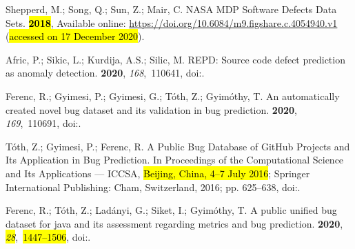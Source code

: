 \documentclass[mathematics,review,accept,moreauthors,pdftex]{Definitions/mdpi}
\begin{document}
\begin{thebibliography}{999}
Shepperd, M.; Song, Q.; Sun, Z.; Mair, C.
\newblock NASA MDP Software Defects Data Sets.  \textbf{\hl{2018}}, Available online: 
\newblock \url{https://doi.org/10.6084/m9.figshare.c.4054940.v1}
(\hl{accessed on 17 December 2020}).

Afric, P.; Sikic, L.; Kurdija, A.S.; Silic, M.
\newblock REPD: Source code defect prediction as anomaly detection.
 {\bf 2020}, {\em 168},~110641,
\newblock
  doi:{\href{https://doi.org/https://doi.org/10.1016/j.jss.2020.110641}{}}.


Ferenc, R.; Gyimesi, P.; Gyimesi, G.; Tóth, Z.; Gyimóthy, T.
\newblock An automatically created novel bug dataset and its validation in bug
  prediction.
 {\bf 2020}, {\em 169},~110691,
\newblock
  doi:{\href{https://doi.org/https://doi.org/10.1016/j.jss.2020.110691}{}}.

T{\'o}th, Z.; Gyimesi, P.; Ferenc, R.
\newblock A Public Bug Database of GitHub Projects and Its Application in Bug
  Prediction.
\newblock   In Proceedings of the Computational Science and Its Applications --- ICCSA, \hl{Beijing, China, 4--7 July 2016}; Springer
  International Publishing: Cham,  Switzerland, 2016; pp. 625--638,
\newblock
  doi:{\href{https://doi.org/https://doi.org/10.1007/978-3-319-42089-9_44}{}}.

Ferenc, R.; T{\'o}th, Z.; Lad{\'a}nyi, G.; Siket, I.; Gyim{\'o}thy, T.
\newblock A public unified bug dataset for java and its assessment regarding
  metrics and bug prediction.
 {\bf 2020}, {\em \hl{28}},~\hl{1447--1506},
\newblock
  doi:{\href{https://doi.org/https://doi.org/10.1007/s11219-020-09515-0}{}}.


\end{thebibliography}
\end{document}
